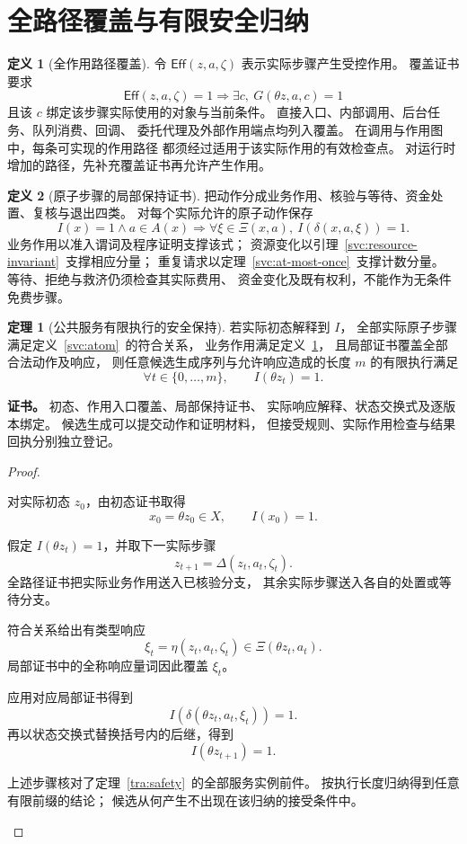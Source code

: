 \documentclass[UTF8,12pt,a4paper,openany,fontset=none,zihao=false]{ctexrep}
\theoremstyle{definition}
\newtheorem{definition}{定义}[chapter]
\newtheorem{theorem}{定理}[chapter]
\newenvironment{certificate}{\par\noindent\textbf{证书。}\ignorespaces}{\par}
\newcommand{\1}{\mathbf 1}
\begin{document}
\section{全路径覆盖与有限安全归纳}

\begin{definition}[全作用路径覆盖]
\label{svc:coverage}
令 \(\mathsf{Eff}(z,a,\zeta)\) 表示实际步骤产生受控作用。
覆盖证书要求
\[
\mathsf{Eff}(z,a,\zeta)=1
\Longrightarrow
\exists c,\ G(\theta z,a,c)=1
\]
且该 \(c\) 绑定该步骤实际使用的对象与当前条件。
直接入口、内部调用、后台任务、队列消费、回调、
委托代理及外部作用端点均列入覆盖。
在调用与作用图中，每条可实现的作用路径
都须经过适用于该实际作用的有效检查点。
对运行时增加的路径，先补充覆盖证书再允许产生作用。
\end{definition}

\begin{definition}[原子步骤的局部保持证书]
\label{svc:local-certificate}
把动作分成业务作用、核验与等待、资金处置、复核与退出四类。
对每个实际允许的原子动作保存
\[
I(x)=1\land a\in A(x)
\Longrightarrow
\forall\xi\in\Xi(x,a),\
I(\delta(x,a,\xi))=1.
\]
业务作用以准入谓词及程序证明支撑该式；
资源变化以引理~\ref{svc:resource-invariant}~支撑相应分量；
重复请求以定理~\ref{svc:at-most-once}~支撑计数分量。
等待、拒绝与救济仍须检查其实际费用、
资金变化及既有权利，不能作为无条件免费步骤。
\end{definition}

\begin{theorem}[公共服务有限执行的安全保持]
\label{svc:finite-safety}
若实际初态解释到 \(I\)，
全部实际原子步骤满足定义~\ref{svc:atom}~的符合关系，
业务作用满足定义~\ref{svc:coverage}，
且局部证书覆盖全部合法动作及响应，
则任意候选生成序列与允许响应造成的长度 \(m\) 的有限执行满足
\[
\forall t\in\{0,\ldots,m\},\qquad I(\theta z_t)=1.
\]
\end{theorem}
\begin{certificate}
初态、作用入口覆盖、局部保持证书、
实际响应解释、状态交换式及逐版本绑定。
候选生成可以提交动作和证明材料，
但接受规则、实际作用检查与结果回执分别独立登记。
\end{certificate}
\begin{proof}
\begin{semanticsteps}
\item 对实际初态 \(z_0\)，由初态证书取得
\[
x_0=\theta z_0\in X,\qquad I(x_0)=1.
\]
\item 假定 \(I(\theta z_t)=1\)，并取下一实际步骤
\[
z_{t+1}=\Delta(z_t,a_t,\zeta_t).
\]
全路径证书把实际业务作用送入已核验分支，
其余实际步骤送入各自的处置或等待分支。
\item 符合关系给出有类型响应
\[
\xi_t=\eta(z_t,a_t,\zeta_t)
\in\Xi(\theta z_t,a_t).
\]
局部证书中的全称响应量词因此覆盖 \(\xi_t\)。
\item 应用对应局部证书得到
\[
I(\delta(\theta z_t,a_t,\xi_t))=1.
\]
再以状态交换式替换括号内的后继，得到
\[
I(\theta z_{t+1})=1.
\]
\item 上述步骤核对了定理~\ref{tra:safety}~的全部服务实例前件。
按执行长度归纳得到任意有限前缀的结论；
候选从何产生不出现在该归纳的接受条件中。
\end{semanticsteps}
\end{proof}
\end{document}
